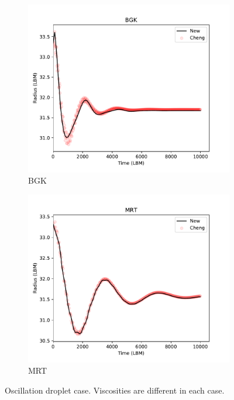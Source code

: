 \documentclass[12pt]{article}
\begin{document}
	\begin{figure}[h]
		\centering
		\begin{subfigure}{.5\textwidth}
			\centering
			\includegraphics[width=.6\linewidth]{pics/BGKOsc.pdf}
			\caption{BGK}
			\label{fig:sub1}
		\end{subfigure}%
		\begin{subfigure}{.5\textwidth}
			\centering
			\includegraphics[width=.6\linewidth]{pics/MRTOsc.pdf}
			\caption{MRT}
			\label{fig:sub2}
		\end{subfigure}
		\caption{Oscillation droplet case. Viscosities are different in each case.}
		\label{fig:osci}
	\end{figure}
	
\end{document}
